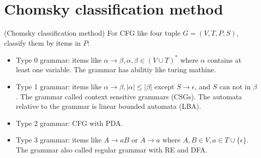     \section{Chomsky classification method}
        \begin{definition}
            (Chomsky classification method) For CFG like four tuple $G=(V,T,P,S)$, classify them by items in $P$:
            \begin{itemize}
                \item Type 0 grammar: items like $\alpha\rightarrow \beta,\alpha,\beta\in (V\cup T)^{*}$ where $\alpha$ contains at least one variable. The grammar has abilitiy like turing mathine.
                \item Type 1 grammar: items like $\alpha\rightarrow \beta,|\alpha|\le |\beta|$ except $S\rightarrow \epsilon$, and $S$ can not in $\beta$. The grammar called context sensitive grammars (CSGs). The automata relative to the grammar is linear bounded automata (LBA).
                \item Type 2 grammar: CFG with PDA.
                \item Type 3 grammar: items like $A\rightarrow aB$ or $A\rightarrow a$ where $A,B\in V,a\in T\cup \{\epsilon\}$. The grammar also called regular grammar with RE and DFA.
            \end{itemize}
        \end{definition}
        

